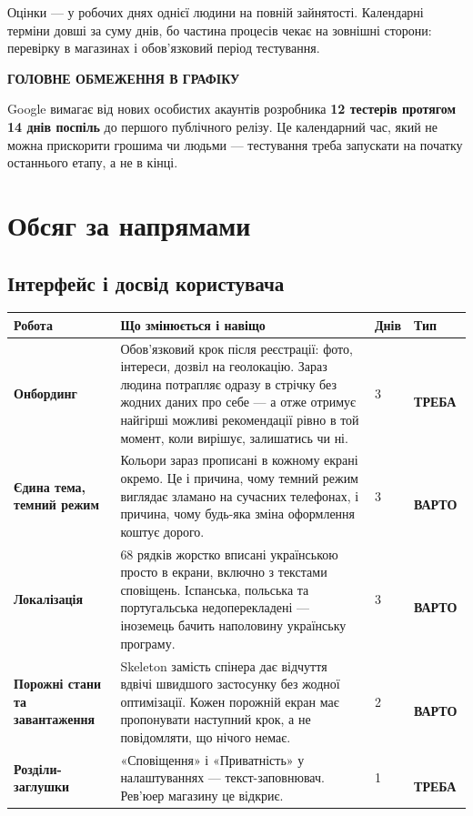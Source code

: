 \documentclass[11pt,a4paper]{article}
\newcommand{\thead}[1]{{\color{muted}\footnotesize\bfseries #1}}
\newcommand{\must}{\colorbox{criticalsoft}{\color{critical}\scriptsize\bfseries\,ТРЕБА\,}}
\newcommand{\rec}{\colorbox{accentsoft}{\color{accent}\scriptsize\bfseries\,ВАРТО\,}}
\newcommand{\notelbl}[2]{{\color{#1}\footnotesize\bfseries\MakeUppercase{#2}}\par\vspace{3pt}}
\begin{document}
Оцінки --- у робочих днях однієї людини на повній зайнятості. Календарні
терміни довші за суму днів, бо частина процесів чекає на зовнішні сторони:
перевірку в магазинах і обов'язковий період тестування.

\begin{note}
\notelbl{critical}{Головне обмеження в графіку}
Google вимагає від нових особистих акаунтів розробника \textbf{12 тестерів
протягом 14 днів поспіль} до першого публічного релізу. Це календарний час,
який не можна прискорити грошима чи людьми --- тестування треба запускати на
початку останнього етапу, а не в кінці.
\end{note}

\section{Обсяг за напрямами}

\subsection{Інтерфейс і досвід користувача }

\begin{xltabular}{\textwidth}{N{3.7cm} Y R{1.1cm} L{1.5cm}}
\toprule
\thead{Робота} & \thead{Що змінюється і навіщо} & \thead{Днів} & \thead{Тип} \\
\midrule

\textbf{Онбординг} &
Обов'язковий крок після реєстрації: фото, інтереси, дозвіл на геолокацію.
Зараз людина потрапляє одразу в стрічку без жодних даних про себе --- а отже
отримує найгірші можливі рекомендації рівно в той момент, коли вирішує,
залишатись чи ні. & 3 & \must \\

\textbf{Єдина тема, темний режим} &
Кольори зараз прописані в кожному екрані окремо. Це і причина, чому темний
режим виглядає зламано на сучасних телефонах, і причина, чому будь-яка зміна
оформлення коштує дорого. & 3 & \rec \\

\textbf{Локалізація} &
68 рядків жорстко вписані українською просто в екрани, включно з текстами
сповіщень. Іспанська, польська та португальська недоперекладені ---
іноземець бачить наполовину українську програму. & 3 & \rec \\

\textbf{Порожні стани та завантаження} &
Skeleton замість спінера дає відчуття вдвічі швидшого застосунку без жодної
оптимізації. Кожен порожній екран має пропонувати наступний крок, а не
повідомляти, що нічого немає. & 2 & \rec \\

\textbf{Розділи-заглушки} &
«Сповіщення» і «Приватність» у налаштуваннях --- текст-заповнювач. Рев'юер
магазину це відкриє. & 1 & \must \\

\bottomrule
\end{xltabular}
\end{document}

